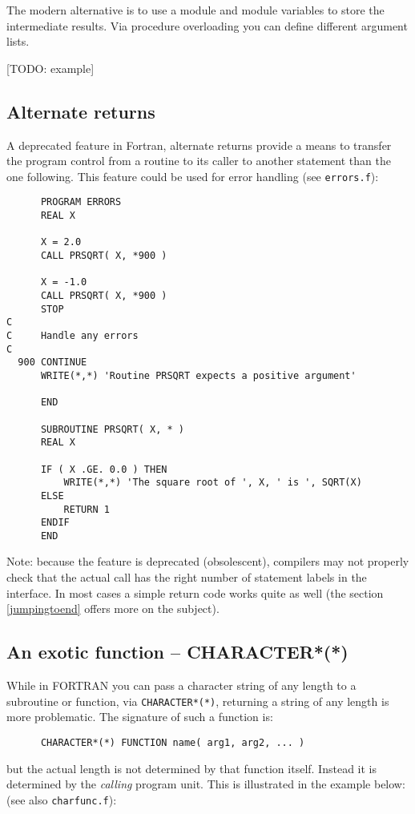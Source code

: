 The modern alternative is to use a module and module variables to store the intermediate results.
Via procedure overloading you can define different argument lists.

[TODO: example]


\subsection{Alternate returns}
A deprecated feature in Fortran, alternate returns provide a means to
transfer the program control from a routine to its caller to another
statement than the one following. This feature could be used for
error handling (see \verb+errors.f+):
\begin{verbatim}
      PROGRAM ERRORS
      REAL X

      X = 2.0
      CALL PRSQRT( X, *900 )

      X = -1.0
      CALL PRSQRT( X, *900 )
      STOP
C
C     Handle any errors
C
  900 CONTINUE
      WRITE(*,*) 'Routine PRSQRT expects a positive argument'

      END

      SUBROUTINE PRSQRT( X, * )
      REAL X

      IF ( X .GE. 0.0 ) THEN
          WRITE(*,*) 'The square root of ', X, ' is ', SQRT(X)
      ELSE
          RETURN 1
      ENDIF
      END
\end{verbatim}

Note: because the feature is deprecated (obsolescent), compilers may not properly check that
the actual call has the right number of statement labels in the interface. In most cases
a simple return code works quite as well (the section \ref{jumpingtoend} offers more
on the subject).


\subsection{An exotic function -- CHARACTER*(*)}
While in FORTRAN you can pass a character string of any length to a subroutine or function,
via \verb+CHARACTER*(*)+, returning a string of any length is more problematic. The signature
of such a function is:

\begin{verbatim}
      CHARACTER*(*) FUNCTION name( arg1, arg2, ... )
\end{verbatim}

\noindent but the actual length is not determined by that function itself. Instead it is
determined by the \emph{calling} program unit. This is illustrated in the example below:
(see also \verb+charfunc.f+):

